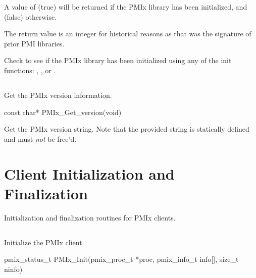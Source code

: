 A value of  (true) will be returned if the PMIx library has been initialized, and  (false) otherwise.

\rationalestart
The return value is an integer for historical reasons as that was the signature of prior PMI libraries.
\rationaleend

\descr

Check to see if the PMIx library has been initialized using any of the init functions:
, , or .

\subsection{}

\summary

Get the PMIx version information.

\format

\cspecificstart
\begin{codepar}
const char* PMIx_Get_version(void)
\end{codepar}
\cspecificend

\descr

Get the \ac{PMIx} version string.
Note that the provided string is statically defined and must \textit{not} be free'd.

\section{Client Initialization and Finalization}
\label{chap:api_init:client}

Initialization and finalization routines for \ac{PMIx} clients.

\subsection{}

\summary

Initialize the \ac{PMIx} client.

\format

\cspecificstart
\begin{codepar}
pmix_status_t
PMIx_Init(pmix_proc_t *proc,
          pmix_info_t info[], size_t ninfo)
\end{codepar}
\cspecificend

